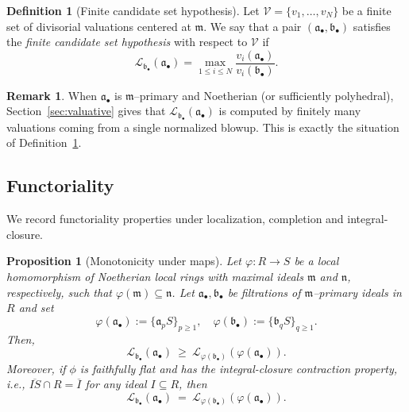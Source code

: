 \documentclass[12pt]{amsart}
\newcommand{\m}{\mathfrak m}
\newcommand{\n}{\mathfrak n}
\renewcommand{\a}{\mathfrak{a}}
\renewcommand{\b}{\mathfrak{b}}
\newcommand{\Loj}{\mathcal{L}} %
\newcommand{\abul}{{\a_\bullet}}
\newcommand{\bbul}{{\b_\bullet}}
\theoremstyle{plain}
\newtheorem{proposition}[theorem]{Proposition}
\theoremstyle{definition}
\newtheorem{definition}[theorem]{Definition}
\newtheorem{remark}[theorem]{Remark}
\numberwithin{equation}{section}
\begin{document}
\begin{definition}[Finite candidate set hypothesis]\label{def:finite-candidates}
	Let $\mathcal V=\{v_1,\dots,v_N\}$ be a finite set of divisorial valuations centered at $\m$.
	We say that a pair $(\abul,\bbul)$ satisfies the \emph{finite candidate set hypothesis}
	with respect to $\mathcal V$ if
	\[
	\Loj_{\bbul}(\abul)=\max_{1\le i\le N}\frac{v_i(\abul)}{v_i(\bbul)}.
	\]
\end{definition}

\begin{remark}
	When $\abul$ is $\m$--primary and Noetherian (or sufficiently polyhedral),
	Section~\ref{sec:valuative} gives that $\Loj_{\bbul}(\abul)$ is computed by finitely many valuations
	coming from a single normalized blowup. This is exactly the situation of
	Definition~\ref{def:finite-candidates}.
\end{remark}

\subsection{Functoriality}
We record functoriality properties under localization, completion and integral-closure.

\begin{proposition}[Monotonicity under maps]\label{prop:functoriality}
	Let $\varphi:R\to S$ be a local homomorphism of Noetherian local rings with maximal ideals
	$\m$ and $\n$, respectively, such that $\varphi(\m)\subseteq \n$.
	Let $\abul,\bbul$ be filtrations of $\m$--primary ideals in $R$ and set
	\[
	\varphi(\abul):=\{\a_p S\}_{p\ge 1},\quad \varphi(\bbul):=\{\b_q S\}_{q\ge 1}.
	\]
	Then,
	\[
	\Loj_{\bbul}(\abul)\ \ge\ \Loj_{\varphi(\bbul)}(\varphi(\abul)).
	\]
	Moreover, if $\phi$ is faithfully flat and has the \emph{integral-closure contraction property}, i.e., $\overline{IS} \cap R = \overline{I}$ for any ideal $I \subseteq R$, then
		\[
	\Loj_{\bbul}(\abul)\ = \ \Loj_{\varphi(\bbul)}(\varphi(\abul)).
	\]
\end{proposition}
\end{document}
